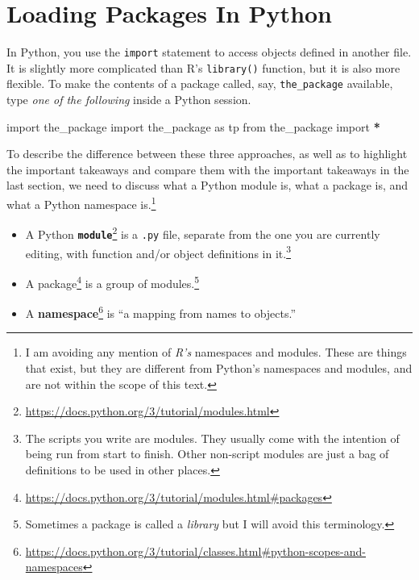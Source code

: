 \documentclass[
  12pt,
  krantz2]{krantz}
\makeatletter
\newenvironment{Shaded}{\begin{snugshade}}{\end{snugshade}}
\newcommand{\ImportTok}[1]{#1}
\newcommand{\NormalTok}[1]{#1}
\newcommand{\OperatorTok}[1]{\textcolor[rgb]{0.43,0.43,0.43}{\textbf{#1}}}
\renewcommand{\href}[2]{#2\footnote{\url{#1}}}
\newenvironment{kframe}{%
\medskip{}
\setlength{\fboxsep}{.8em}
 \def\at@end@of@kframe{}%
 \ifinner\ifhmode%
  \def\at@end@of@kframe{\end{minipage}}%
  \begin{minipage}{\columnwidth}%
 \fi\fi%
 \def\FrameCommand##1{\hskip\@totalleftmargin \hskip-\fboxsep
 \colorbox{shadecolor}{##1}\hskip-\fboxsep
     \hskip-\linewidth \hskip-\@totalleftmargin \hskip\columnwidth}%
 \MakeFramed {\advance\hsize-\width
   \@totalleftmargin\z@ \linewidth\hsize
   \@setminipage}}%
 {\par\unskip\endMakeFramed%
 \at@end@of@kframe}
\renewenvironment{Shaded}{\begin{kframe}}{\end{kframe}}
\makeatother
\begin{document}
\hypertarget{loading-packages-in-python}{%
\section{Loading Packages In Python}\label{loading-packages-in-python}}

In Python, you use the \texttt{import} statement to access objects defined in another file. It is slightly more complicated than R's \texttt{library()} function, but it is also more flexible. To make the contents of a package called, say, \texttt{the\_package} available, type \emph{one of the following} inside a Python session.

\begin{Shaded}
\begin{Highlighting}[]
\ImportTok{import}\NormalTok{ the\_package}
\ImportTok{import}\NormalTok{ the\_package }\ImportTok{as}\NormalTok{ tp }
\ImportTok{from}\NormalTok{ the\_package }\ImportTok{import} \OperatorTok{*}
\end{Highlighting}
\end{Shaded}

To describe the difference between these three approaches, as well as to highlight the important takeaways and compare them with the important takeaways in the last section, we need to discuss what a Python module is, what a package is, and what a Python namespace is.\footnote{I am avoiding any mention of \emph{R's} namespaces and modules. These are things that exist, but they are different from Python's namespaces and modules, and are not within the scope of this text.}

\begin{itemize}
\item
  A Python \href{https://docs.python.org/3/tutorial/modules.html}{\textbf{\texttt{module}}} is a \texttt{.py} file, separate from the one you are currently editing, with function and/or object definitions in it.\footnote{The scripts you write are modules. They usually come with the intention of being run from start to finish. Other non-script modules are just a bag of definitions to be used in other places.}
\item
  A \href{https://docs.python.org/3/tutorial/modules.html\#packages}{package} is a group of modules.\footnote{Sometimes a package is called a \emph{library} but I will avoid this terminology.}
\item
  A \href{https://docs.python.org/3/tutorial/classes.html\#python-scopes-and-namespaces}{\textbf{namespace}} is ``a mapping from names to objects.''
\end{itemize}
\end{document}
